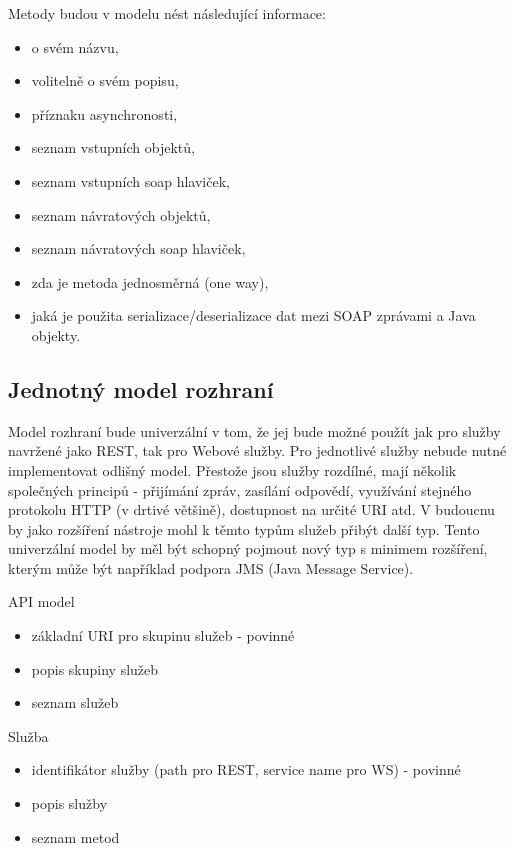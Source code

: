 \documentclass[11pt,twoside,a4paper]{book}
\begin{document}
\begin{itemize}
Metody budou v modelu nést následující informace:

\begin{itemize}
  \item o svém názvu,
  \item volitelně o svém popisu,
  \item příznaku asynchronosti,
  \item seznam vstupních objektů,
  \item seznam vstupních soap hlaviček,
  \item seznam návratových objektů,
  \item seznam návratových soap hlaviček,
  \item zda je metoda jednosměrná (one way),
  \item jaká je použita serializace/deserializace dat mezi SOAP zprávami a Java objekty.
\end{itemize}

\subsection{Jednotný model rozhraní}

Model rozhraní bude univerzální v tom, že jej bude možné použít jak pro služby navržené
jako REST, tak pro Webové služby. Pro jednotlivé služby nebude nutné implementovat
odlišný model. Přestože jsou služby rozdílné, mají několik společných principů - přijímání
zpráv, zasílání odpovědí, využívání stejného protokolu HTTP (v drtivé většině), dostupnost na
určité URI atd. V budoucnu by jako rozšíření nástroje mohl k těmto typům služeb přibýt další
typ. Tento univerzální model by měl být schopný pojmout nový typ s minimem rozšíření,
kterým může být například podpora JMS (Java Message Service).

API model

\begin{itemize}
  \item základní URI pro skupinu služeb - povinné
  \item popis skupiny služeb
  \item seznam služeb
\end{itemize}

Služba

\begin{itemize}
  \item identifikátor služby (path pro REST, service name pro WS) - povinné
  \item popis služby
  \item seznam metod
\end{itemize}


\end{itemize}
\end{document}
